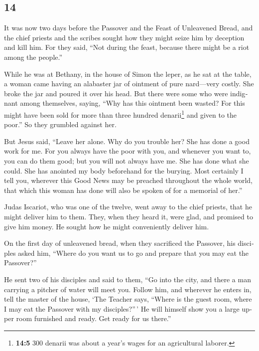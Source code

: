 \begin{paracol}{2}
\begin{otherlanguage}{english}
\hypertarget{section-26}{%
\section{14}\label{section-26}}

 It was now two days before the Passover and the Feast of
Unleavened Bread, and the chief priests and the scribes sought how they
might seize him by deception and kill him.  For they said,
``Not during the feast, because there might be a riot among the
people.''

 While he was at Bethany, in the house of Simon the leper,
as he sat at the table, a woman came having an alabaster jar of ointment
of pure nard---very costly. She broke the jar and poured it over his
head.  But there were some who were indignant among
themselves, saying, ``Why has this ointment been wasted? 
For this might have been sold for more than three hundred
denarii\footnote{\textbf{14:5} 300 denarii was about a year's wages for
  an agricultural laborer.} and given to the poor.'' So they grumbled
against her.

 But Jesus said, ``Leave her alone. Why do you trouble
her? She has done a good work for me.  For you always have
the poor with you, and whenever you want to, you can do them good; but
you will not always have me.  She has done what she could.
She has anointed my body beforehand for the burying.  Most
certainly I tell you, wherever this Good News may be preached throughout
the whole world, that which this woman has done will also be spoken of
for a memorial of her.''

 Judas Iscariot, who was one of the twelve, went away to
the chief priests, that he might deliver him to them. 
They, when they heard it, were glad, and promised to give him money. He
sought how he might conveniently deliver him.

 On the first day of unleavened bread, when they
sacrificed the Passover, his disciples asked him, ``Where do you want us
to go and prepare that you may eat the Passover?''

 He sent two of his disciples and said to them, ``Go into
the city, and there a man carrying a pitcher of water will meet you.
Follow him,  and wherever he enters in, tell the master
of the house, `The Teacher says, ``Where is the guest room, where I may
eat the Passover with my disciples?''\,'  He will himself
show you a large upper room furnished and ready. Get ready for us
there.''


\end{otherlanguage}
\end{paracol}
